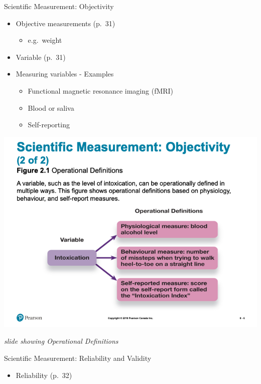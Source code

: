 \documentclass[
]{book}
\providecommand{\tightlist}{%
  \setlength{\itemsep}{0pt}\setlength{\parskip}{0pt}}
\begin{document}
\begin{reflect}
Scientific Measurement: Objectivity

\begin{itemize}
\tightlist
\item
  Objective measurements (p.~31)

  \begin{itemize}
  \tightlist
  \item
    e.g.~weight\\
  \end{itemize}
\item
  Variable (p.~31)\\
\item
  Measuring variables - Examples

  \begin{itemize}
  \tightlist
  \item
    Functional magnetic resonance imaging (fMRI)\\
  \item
    Blood or saliva\\
  \item
    Self-reporting
  \end{itemize}
\end{itemize}

\includegraphics{assets/unit_1/PSYC106-Chs2-ResearchandThoughtandLanguage-3rdEd.png}

\emph{slide showing Operational Definitions}

Scientific Measurement: Reliability and Validity

\begin{itemize}
\tightlist
\item
  Reliability (p.~32)


\end{itemize}
\end{reflect}
\end{document}
